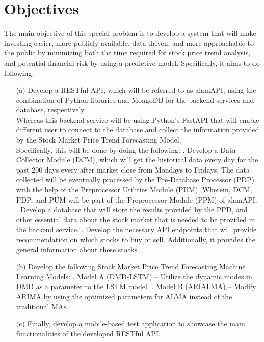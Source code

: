 \section{Objectives}
\label{sec:objectives}
The main objective of this special problem is to develop a 
system that will make investing easier, more publicly available, 
data-driven, and more approachable to the public by minimizing both the 
time required for stock price trend analysis, and potential financial risk 
by using a predictive model. Specifically, it aims to do following:
\begin{itemize}
  \item[(a)] Develop a RESTful API, which will be referred to as alamAPI, 
  using the combination of Python libraries and MongoDB for the backend 
  services and database, respectively.
  \hfill \\
  
  Whereas this backend service will be using Python’s 
  FastAPI that will enable different user to connect to 
  the database and collect the information provided by the 
  Stock Market Price Trend Forecasting Model.
  \hfill \\
  
  Specifically, this will be done by doing the following:
  .	Develop a Data Collector Module (DCM), 
  which will get the historical data every day for 
  the past 200 days every after market close from Mondays to Fridays. 
  The data collected will be eventually processed by the Pre-Database Processor 
  (PDP) with the help of the Preprocessor Utilities Module (PUM). 
  Wherein, DCM, PDP, and PUM will be part of the Preprocessor Module 
  (PPM) of alamAPI.
  .	Develop a database that will store the results provided by the PPD,
  and other essential data about the stock market that is needed to be provided
  in the backend service.
  .	Develop the necessary API endpoints 
  that will provide recommendation on which stocks to buy or sell. 
  Additionally, it provides the general information about these stocks.
  \item[(b)] Develop the following Stock Market Price Trend Forecasting 
  Machine Learning Models:
    .	Model A (DMD-LSTM) – Utilize the dynamic modes in DMD as a 
    parameter to the LSTM model.
    . Model B (ARIALMA) – Modify ARIMA by using 
    the optimized parameters for ALMA instead of the traditional MAs.
  \item[(c)] Finally, develop a mobile-based test application to showcase 
  the main functionalities of the developed RESTful API.
\end{itemize}